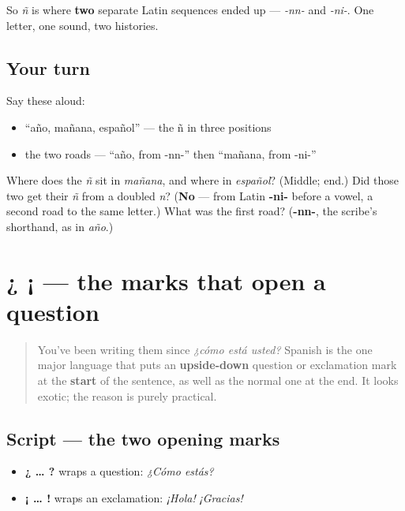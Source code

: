 So \emph{ñ} is where \textbf{two} separate Latin sequences ended up — \emph{-nn-} and \emph{-ni-}. One letter, one sound, two histories.

\subsection*{Your turn}
Say these aloud:

\begin{itemize}
\raggedright
  \item \textquotedblleft{}año, mañana, español\textquotedblright{} — the ñ in three positions
  \item the two roads — \textquotedblleft{}año, from -nn-\textquotedblright{} then \textquotedblleft{}mañana, from -ni-\textquotedblright{}
\end{itemize}

\begin{tcolorbox}[breakable,colback=teal!4,colframe=teal!35!black,title={Before you move on}]
Where does the \emph{ñ} sit in \emph{mañana}, and where in \emph{español}? (Middle; end.) Did those two get their \emph{ñ} from a doubled \emph{n}? (\textbf{No} — from Latin \textbf{-ni-} before a vowel, a second road to the same letter.) What was the first road? (\textbf{-nn-}, the scribe's shorthand, as in \emph{año}.)
\end{tcolorbox}
\section[¿ ¡]{¿ ¡ — the marks that open a question}

\label{lesson:ES-W03-inverted}



\begin{quote}
You've been writing them since \emph{¿cómo está usted?} Spanish is the one major language that puts an \textbf{upside-down} question or exclamation mark at the \textbf{start} of the sentence, as well as the normal one at the end. It looks exotic; the reason is purely practical.
\end{quote}

\subsection*{Script — the two opening marks}

\begin{itemize}
\raggedright
  \item \textbf{¿ … ?} wraps a question: \emph{¿Cómo estás?}
  \item \textbf{¡ … !} wraps an exclamation: \emph{¡Hola!} \emph{¡Gracias!}
\end{itemize}

